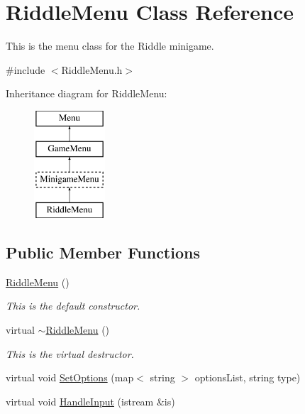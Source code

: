 \hypertarget{classRiddleMenu}{\section{Riddle\-Menu Class Reference}
\label{classRiddleMenu}
}


This is the menu class for the Riddle minigame.  




{\ttfamily \#include $<$Riddle\-Menu.\-h$>$}

Inheritance diagram for Riddle\-Menu\-:\begin{figure}[H]
\begin{center}
\leavevmode
\includegraphics[height=4.000000cm]{classRiddleMenu}
\end{center}
\end{figure}
\subsection*{Public Member Functions}
\begin{DoxyCompactItemize}
\item 
\hyperlink{classRiddleMenu_a68e4be3bbc49bdb2f3d8a9fda74614d9}{Riddle\-Menu} ()
\begin{DoxyCompactList}\small\item\em This is the default constructor. \end{DoxyCompactList}\item 
virtual \hyperlink{classRiddleMenu_a1a77b919ba79fc3069ffaae5d4a5c706}{$\sim$\-Riddle\-Menu} ()
\begin{DoxyCompactList}\small\item\em This is the virtual destructor. \end{DoxyCompactList}\item 
virtual void \hyperlink{classRiddleMenu_a42ebb9392f4405067cee35af0f76b739}{Set\-Options} (map$<$ string $>$ options\-List, string type)
\item 
virtual void \hyperlink{classRiddleMenu_ade9f37fcc53c0b32616039c1fa627b16}{Handle\-Input} (istream \&is)
\end{DoxyCompactItemize}
